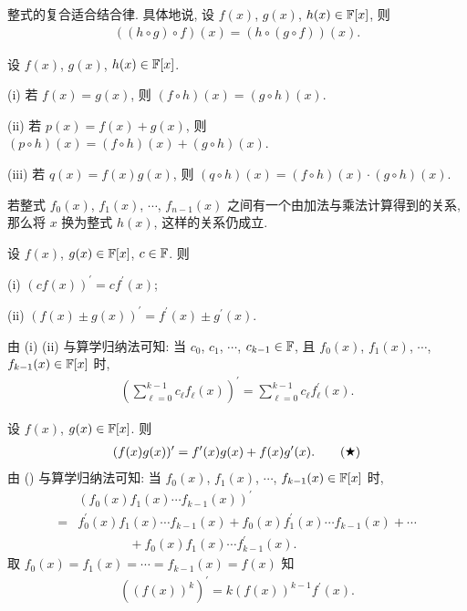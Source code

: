 \begin{proposition}
    整式的复合适合结合律. 具体地说, 设 $f(x)$, $g(x)$, $h(x) \in \mathbb{F}[x]$, 则
    \begin{align*}
        ((h \circ g) \circ f)(x) = (h \circ (g \circ f))(x).
    \end{align*}
\end{proposition}

\begin{proposition}
    设 $f(x)$, $g(x)$, $h(x) \in \mathbb{F}[x]$.

    (i) 若 $f(x) = g(x)$, 则 $(f \circ h)(x) = (g \circ h)(x)$.

    (ii) 若 $p(x) = f(x) + g(x)$, 则 $(p \circ h)(x) = (f \circ h)(x) + (g \circ h)(x)$.

    (iii) 若 $q(x) = f(x) g(x)$, 则 $(q \circ h)(x) = (f \circ h)(x) \cdot (g \circ h)(x)$.
\end{proposition}

\begin{proposition}
    若整式 $f_0 (x)$, $f_1 (x)$, $\cdots$, $f_{n-1} (x)$ 之间有一个由加法与乘法计算得到的关系, 那么将 $x$ 换为整式 $h(x)$, 这样的关系仍成立.
\end{proposition}

\begin{proposition}
    设 $f(x)$, $g(x) \in \mathbb{F}[x]$, $c \in \mathbb{F}$. 则

    (i) $(cf(x))^{\prime} = c f^{\prime} (x)$;

    (ii) $(f(x) \pm g(x))^{\prime} = f^{\prime} (x) \pm g^{\prime} (x)$.

    由 (i) (ii) 与算学归纳法可知: 当 $c_0$, $c_1$, $\cdots$, $c_{k-1} \in \mathbb{F}$, 且 $f_0 (x)$, $f_1 (x)$, $\cdots$, $f_{k-1} (x) \in \mathbb{F}[x]$ 时,
    \begin{align*}
        \left( \sum_{\ell = 0}^{k-1} c_\ell f_\ell (x) \right)^{\prime} = \sum_{\ell = 0}^{k-1} c_\ell f_\ell^{\prime} (x).
    \end{align*}
\end{proposition}

\begin{proposition}
    设 $f(x)$, $g(x) \in \mathbb{F}[x]$. 则
    \begin{align*}
        (f(x) g(x))^{\prime} = f^{\prime} (x) g(x) + f(x) g^{\prime} (x). \tag*{(\ding{72})}
    \end{align*}
    由 () 与算学归纳法可知: 当 $f_0 (x)$, $f_1 (x)$, $\cdots$, $f_{k-1} (x) \in \mathbb{F}[x]$ 时,
    \begin{align*}
             & (f_0 (x) f_1 (x) \cdots f_{k-1} (x))^{\prime}                                                      \\
        = {} & f_0^{\prime} (x) f_1 (x) \cdots f_{k-1} (x) + f_0 (x) f_1^{\prime} (x) \cdots f_{k-1} (x) + \cdots \\
             & \qquad \qquad + f_0 (x) f_1 (x) \cdots f_{k-1}^{\prime} (x).
    \end{align*}
    取 $f_0 (x) = f_1 (x) = \cdots = f_{k-1} (x) = f(x)$ 知
    \begin{align*}
        ((f(x))^k)^{\prime} = k(f(x))^{k-1} f^{\prime} (x).
    \end{align*}
\end{proposition}

